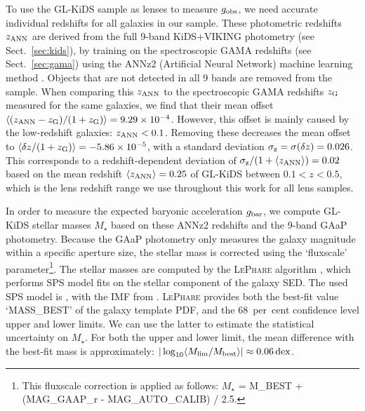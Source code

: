 \documentclass[usenatbib]{mnras}
\newcommand{\lan}{\langle}
\newcommand{\ran}{\rangle}
\newcommand*{\meanb}[1]{\langle{#1}\rangle}
\newcommand*{\E}[1]{\times 10^{#1}}
\newcommand{\un}[1]{_{\rm #1}}
\newcommand{\dex}{\, {\rm dex}}
\begin{document}
To use the GL-KiDS sample as lenses to measure $g\un{obs}$, we need accurate individual redshifts for all galaxies in our sample. These photometric redshifts $z\un{ANN}$ are derived from the full 9-band KiDS+VIKING photometry (see Sect.~\ref{sec:kids}), by training on the spectroscopic GAMA redshifts (see Sect.~\ref{sec:gama}) using the ANNz2 (Artificial Neural Network) machine learning method \cite[]{sadeh2016,dejong2017,bilicki2017}. Objects that are not detected in all 9 bands are removed from the sample. When comparing this $z\un{ANN}$ to the spectroscopic GAMA redshifts $z\un{G}$ measured for the same galaxies, we find that their mean offset $\meanb{(z\un{ANN} - z\un{G})/(1+z\un{G})} = 9.29\E{-4}$. However, this offset is mainly caused by the low-redshift galaxies: $z\un{ANN}<0.1$. Removing these decreases the mean offset to $\meanb{\delta z/(1+z\un{G})} = -5.86\E{-5}$, with a standard deviation $\sigma\un{z} = \sigma(\delta z) = 0.026$. This corresponds to a redshift-dependent deviation of $\sigma\un{z}/(1+\meanb{z\un{ANN}})=0.02$ based on the mean redshift $\meanb{z\un{ANN}} = 0.25$ of GL-KiDS between $0.1<z<0.5$, which is the lens redshift range we use throughout this work for all lens samples.

In order to measure the expected baryonic acceleration $g\un{bar}$, we compute GL-KiDS stellar masses $M_\star$ based on these ANNz2 redshifts and the 9-band GAaP photometry. Because the GAaP photometry only measures the galaxy magnitude within a specific aperture size, the stellar mass is corrected using the `fluxscale' parameter\footnote{This fluxscale correction is applied as follows: $M_\star$ = M\_BEST + (MAG\_GAAP\_r - MAG\_AUTO\_CALIB) / 2.5.}. The stellar masses are computed by the \textsc{LePhare} algorithm \cite[]{arnouts1999, ilbert2006}, which performs SPS model fits on the stellar component of the galaxy SED. The used SPS model is \cite{bruzual2003}, with the IMF from \citet[][equal to those used for the GAMA stellar masses]{chabrier2003}. \textsc{LePhare} provides both the best-fit value `MASS\_BEST' of the galaxy template PDF, and the $68$~per~cent confidence level upper and lower limits. We can use the latter to estimate the statistical uncertainty on $M_\star$. For both the upper and lower limit, the mean difference with the best-fit mass is approximately: $|\log_{10}\lan M\un{lim}/M\un{best} \ran| \approx 0.06 \dex$.
\end{document}
